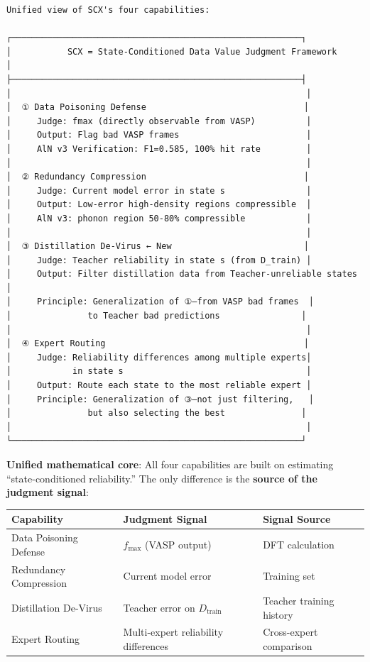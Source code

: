 \documentclass[
  12pt,
]{article}
\begin{document}
\begin{verbatim}
Unified view of SCX's four capabilities:

┌─────────────────────────────────────────────────────────┐
│           SCX = State-Conditioned Data Value Judgment Framework        │
├─────────────────────────────────────────────────────────┤
│                                                          │
│  ① Data Poisoning Defense                               │
│     Judge: fmax (directly observable from VASP)          │
│     Output: Flag bad VASP frames                         │
│     AlN v3 Verification: F1=0.585, 100% hit rate         │
│                                                          │
│  ② Redundancy Compression                               │
│     Judge: Current model error in state s                │
│     Output: Low-error high-density regions compressible  │
│     AlN v3: phonon region 50-80% compressible            │
│                                                          │
│  ③ Distillation De-Virus ← New                          │
│     Judge: Teacher reliability in state s (from D_train) │
│     Output: Filter distillation data from Teacher-unreliable states │
│     Principle: Generalization of ①—from VASP bad frames  │
│               to Teacher bad predictions                │
│                                                          │
│  ④ Expert Routing                                       │
│     Judge: Reliability differences among multiple experts│
│            in state s                                    │
│     Output: Route each state to the most reliable expert │
│     Principle: Generalization of ③—not just filtering,   │
│               but also selecting the best               │
│                                                          │
└─────────────────────────────────────────────────────────┘
\end{verbatim}

\textbf{Unified mathematical core}: All four capabilities are built on estimating ``state-conditioned reliability.'' The only difference is the \textbf{source of the judgment signal}:

\begin{longtable}[]{@{}lll@{}}
\toprule\noalign{}
Capability & Judgment Signal & Signal Source \\
\midrule\noalign{}
\endhead
\bottomrule\noalign{}
\endlastfoot
Data Poisoning Defense & $f_{\max}$ (VASP output) & DFT calculation \\
Redundancy Compression & Current model error & Training set \\
Distillation De-Virus & Teacher error on $D_{\text{train}}$ & Teacher training history \\
Expert Routing & Multi-expert reliability differences & Cross-expert comparison \\
\end{longtable}
\end{document}
